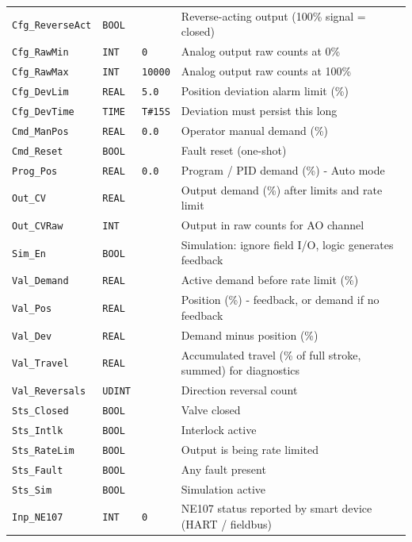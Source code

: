 {\begin{longtable}{@{}>{\raggedright\arraybackslash}p{3.4cm}>{\raggedright\arraybackslash}p{3.3cm}>{\raggedright\arraybackslash}p{1.3cm}>{\raggedright\arraybackslash}p{6.4cm}@{}}
\texttt{Cfg\_ReverseAct} & \texttt{BOOL} &  & Reverse-acting output (100\% signal = closed) \\
\texttt{Cfg\_RawMin} & \texttt{INT} & \texttt{0} & Analog output raw counts at 0\% \\
\texttt{Cfg\_RawMax} & \texttt{INT} & \texttt{10000} & Analog output raw counts at 100\% \\
\texttt{Cfg\_DevLim} & \texttt{REAL} & \texttt{5.0} & Position deviation alarm limit (\%) \\
\texttt{Cfg\_DevTime} & \texttt{TIME} & \texttt{T\#15S} & Deviation must persist this long \\
\texttt{Cmd\_ManPos} & \texttt{REAL} & \texttt{0.0} & Operator manual demand (\%) \\
\texttt{Cmd\_Reset} & \texttt{BOOL} &  & Fault reset (one-shot) \\
\texttt{Prog\_Pos} & \texttt{REAL} & \texttt{0.0} & Program /\allowbreak{} PID demand (\%) - Auto mode \\
\texttt{Out\_CV} & \texttt{REAL} &  & Output demand (\%) after limits and rate limit \\
\texttt{Out\_CVRaw} & \texttt{INT} &  & Output in raw counts for AO channel \\
\texttt{Sim\_En} & \texttt{BOOL} &  & Simulation: ignore field I/\allowbreak{}O, logic generates feedback \\
\texttt{Val\_Demand} & \texttt{REAL} &  & Active demand before rate limit (\%) \\
\texttt{Val\_Pos} & \texttt{REAL} &  & Position (\%) - feedback, or demand if no feedback \\
\texttt{Val\_Dev} & \texttt{REAL} &  & Demand minus position (\%) \\
\texttt{Val\_Travel} & \texttt{REAL} &  & Accumulated travel (\% of full stroke, summed) for diagnostics \\
\texttt{Val\_Reversals} & \texttt{UDINT} &  & Direction reversal count \\
\texttt{Sts\_Closed} & \texttt{BOOL} &  & Valve closed \\
\texttt{Sts\_Intlk} & \texttt{BOOL} &  & Interlock active \\
\texttt{Sts\_RateLim} & \texttt{BOOL} &  & Output is being rate limited \\
\texttt{Sts\_Fault} & \texttt{BOOL} &  & Any fault present \\
\texttt{Sts\_Sim} & \texttt{BOOL} &  & Simulation active \\
\texttt{Inp\_NE107} & \texttt{INT} & \texttt{0} & NE107 status reported by smart device (HART /\allowbreak{} fieldbus) \\

\end{longtable}}
